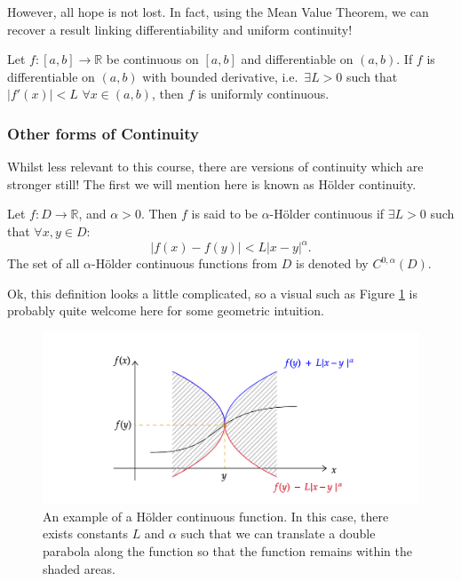 \documentclass[
  12pt,
  a4paper]{extarticle}
\theoremstyle{plain}
\theoremstyle{definition}
\theoremstyle{plain}
\theoremstyle{plain}
\theoremstyle{plain}
\theoremstyle{plain}
\theoremstyle{definition}
\theoremstyle{definition}
\theoremstyle{remark}
\theoremstyle{remark}
\let\BeginKnitrBlock\begin \let\EndKnitrBlock\end
\renewcommand{\;}{\,}
\begin{document}
However, all hope is not lost. In fact, using the Mean Value Theorem, we can recover a result linking differentiability and uniform continuity!

\BeginKnitrBlock{proposition}
{\label{prp:prop3} }Let \(f:[a,b] \to \mathbb{R}\) be continuous on \([a,b]\) and differentiable on \((a,b).\) If \(f\) is differentiable on \((a,b)\) with bounded derivative, i.e.~\(\exists L > 0\) such that \(\lvert f'(x) \rvert < L \;\;\forall x \in (a,b)\), then \(f\) is uniformly continuous.
\EndKnitrBlock{proposition}

\hypertarget{other-forms-of-continuity}{%
\subsubsection{Other forms of Continuity}\label{other-forms-of-continuity}}

Whilst less relevant to this course, there are versions of continuity which are stronger still! The first we will mention here is known as Hölder continuity.

\BeginKnitrBlock{definition}[Hölder Continuity]
{\label{def:def5} }Let \(f:D \to \mathbb{R}\), and \(\alpha>0\). Then \(f\) is said to be \(\alpha\)-Hölder continuous if \(\exists L > 0\) such that \(\forall x,y \in D\): \[\lvert f(x) - f(y) \rvert < L \lvert x - y \rvert^{\alpha}.\] The set of all \(\alpha\)-Hölder continuous functions from \(D\) is denoted by \(C^{0,\alpha}\left(D\right).\)
\EndKnitrBlock{definition}

Ok, this definition looks a little complicated, so a visual such as Figure \ref{fig:Holder} is probably quite welcome here for some geometric intuition.

\begin{figure}

{\centering \includegraphics[width=\Width,height=\Height]{Holder} 

}

\caption{An example of a Hölder continuous function. In this case, there exists constants $L$ and $\alpha$ such that we can translate a double parabola along the function so that the function remains within the shaded areas.}\label{fig:Holder}
\end{figure}
\end{document}
